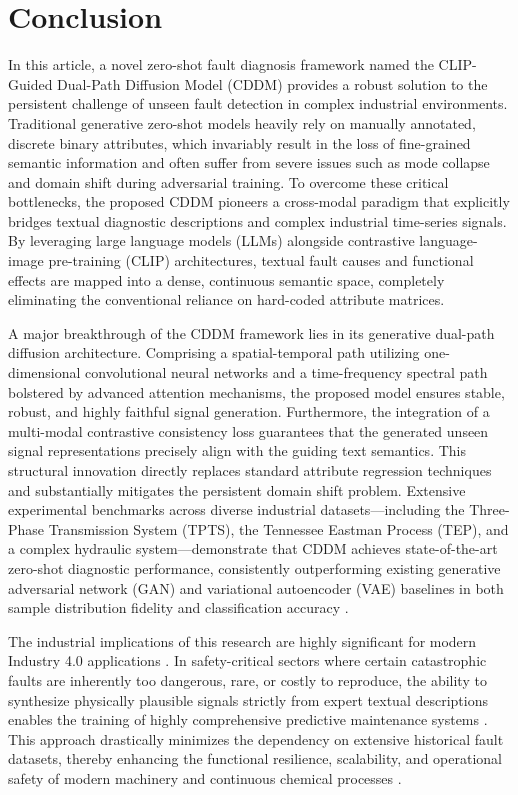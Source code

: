 \section{Conclusion}

In this article, a novel zero-shot fault diagnosis framework named the CLIP-Guided Dual-Path Diffusion Model (CDDM) provides a robust solution to the persistent challenge of unseen fault detection in complex industrial environments. Traditional generative zero-shot models heavily rely on manually annotated, discrete binary attributes, which invariably result in the loss of fine-grained semantic information and often suffer from severe issues such as mode collapse and domain shift during adversarial training. To overcome these critical bottlenecks, the proposed CDDM pioneers a cross-modal paradigm that explicitly bridges textual diagnostic descriptions and complex industrial time-series signals. By leveraging large language models (LLMs) alongside contrastive language-image pre-training (CLIP) architectures, textual fault causes and functional effects are mapped into a dense, continuous semantic space, completely eliminating the conventional reliance on hard-coded attribute matrices.

A major breakthrough of the CDDM framework lies in its generative dual-path diffusion architecture. Comprising a spatial-temporal path utilizing one-dimensional convolutional neural networks and a time-frequency spectral path bolstered by advanced attention mechanisms, the proposed model ensures stable, robust, and highly faithful signal generation. Furthermore, the integration of a multi-modal contrastive consistency loss guarantees that the generated unseen signal representations precisely align with the guiding text semantics. This structural innovation directly replaces standard attribute regression techniques and substantially mitigates the persistent domain shift problem. Extensive experimental benchmarks across diverse industrial datasets—including the Three-Phase Transmission System (TPTS), the Tennessee Eastman Process (TEP), and a complex hydraulic system—demonstrate that CDDM achieves state-of-the-art zero-shot diagnostic performance, consistently outperforming existing generative adversarial network (GAN) and variational autoencoder (VAE) baselines in both sample distribution fidelity and classification accuracy \cite{tzeng2017adversarial}.

The industrial implications of this research are highly significant for modern Industry 4.0 applications \cite{wang2020deep,lee2014prognostics}. In safety-critical sectors where certain catastrophic faults are inherently too dangerous, rare, or costly to reproduce, the ability to synthesize physically plausible signals strictly from expert textual descriptions enables the training of highly comprehensive predictive maintenance systems \cite{lee2014prognostics}. This approach drastically minimizes the dependency on extensive historical fault datasets, thereby enhancing the functional resilience, scalability, and operational safety of modern machinery and continuous chemical processes \cite{precup2015overview}.

